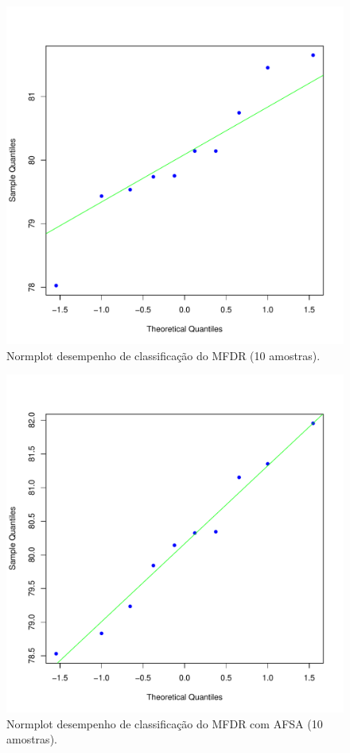 \documentclass[conference]{IEEEtran}
\begin{document}
\begin{figure}[h]
	\centering
	\includegraphics[width=\linewidth]{img/bluenorm_mfdr.pdf}
	\caption{Normplot desempenho de classificação do MFDR (10 amostras).}
	\label{fig:norm_mfdr}
\end{figure}

\begin{figure}[h]
	\centering
	\includegraphics[width=\linewidth]{img/bluenorm_afsa_mfdr.pdf}
	\caption{Normplot desempenho de classificação do MFDR com AFSA (10 amostras).}
	\label{fig:norm_afsa_mfdr}
\end{figure}
\end{document}
